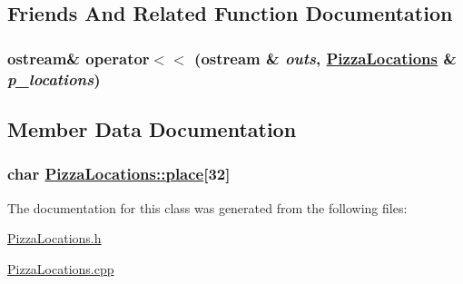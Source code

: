 \subsection{Friends And Related Function Documentation}
\hypertarget{class_pizza_locations_7a5ef62906b8b087fcc29903cd696ef0}{
\subsubsection[operator$<$$<$]{\setlength{\rightskip}{0pt plus 5cm}ostream\& operator$<$$<$ (ostream \& {\em outs}, \hyperlink{class_pizza_locations}{Pizza\-Locations} \& {\em p\_\-locations})}}
\label{class_pizza_locations_7a5ef62906b8b087fcc29903cd696ef0}




\subsection{Member Data Documentation}
\hypertarget{class_pizza_locations_247f35efd255fe4af3b63f76e9c58b25}{
\subsubsection[place]{\setlength{\rightskip}{0pt plus 5cm}char \hyperlink{class_pizza_locations_247f35efd255fe4af3b63f76e9c58b25}{Pizza\-Locations::place}\mbox{[}32\mbox{]}}}
\label{class_pizza_locations_247f35efd255fe4af3b63f76e9c58b25}




The documentation for this class was generated from the following files:\begin{CompactItemize}
\item 
\hyperlink{_pizza_locations_8h}{Pizza\-Locations.h}\item 
\hyperlink{_pizza_locations_8cpp}{Pizza\-Locations.cpp}\end{CompactItemize}
